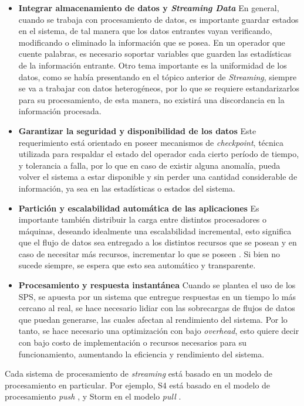 \begin{itemize}
	\item \textbf{Integrar almacenamiento de datos y \textit{Streaming Data}} En general, cuando se trabaja con procesamiento de datos, es importante guardar estados en el sistema, de tal manera que los datos entrantes vayan verificando, modificando o eliminado la información que se posea. En un operador que cuente palabras, es necesario soportar variables que guarden las estadísticas de la información entrante. Otro tema importante es la uniformidad de los datos, como se había presentando en el tópico anterior de \textit{Streaming}, siempre se va a trabajar con datos heterogéneos, por lo que se requiere estandarizarlos para su procesamiento, de esta manera, no existirá una discordancia en la información procesada.
	\item \textbf{Garantizar la seguridad y disponibilidad de los datos} Este requerimiento está orientado en poseer mecanismos de \textit{checkpoint}, técnica utilizada para respaldar el estado del operador cada cierto período de tiempo, y tolerancia a falla, por lo que en caso de existir alguna anomalía, pueda volver el sistema a estar disponible y sin perder una cantidad considerable de información, ya sea en las estadísticas o estados del sistema.
	\item \textbf{Partición y escalabilidad automática de las aplicaciones} Es importante también distribuir la carga entre distintos procesadores o máquinas, deseando idealmente una escalabilidad incremental, esto significa que el flujo de datos sea entregado a los distintos recursos que se posean y en caso de necesitar más recursos, incrementar lo que se poseen \citep{bookTanenbaum}. Si bien no sucede siempre, se espera que esto sea automático y transparente.
	\item \textbf{Procesamiento y respuesta instantánea} Cuando se plantea el uso de los SPS, se apuesta por un sistema que entregue respuestas en un tiempo lo más cercano al real, se hace necesario lidiar con las sobrecargas de flujos de datos que puedan generarse, las cuales afectan al rendimiento del sistema. Por lo tanto, se hace necesario una optimización con bajo \textit{overhead}, esto quiere decir con bajo costo de implementación o recursos necesarios para su funcionamiento, aumentando la eficiencia y rendimiento del sistema.
\end{itemize}

Cada sistema de procesamiento de \textsl{streaming} está basado en un modelo de procesamiento en particular. Por ejemplo, S4 está basado en el modelo de procesamiento \textsl{push} \citep{s4yahoo}, y Storm en el modelo \textsl{pull} \citep{stormtwitter}.

